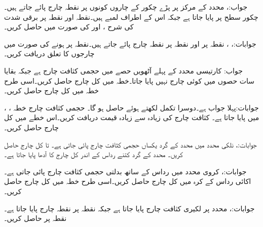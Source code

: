 جواب:، 
محدد کے مرکز پر پڑے چکور کے چاروں کونوں پر  نقطہ چارج پائے جاتے ہیں۔چکور  سطح پر پایا جاتا ہے جبکہ اس کے اطراف  لمبے ہیں۔نقطہ  اور نقطہ  پر برقی شدت کی شرح ،  اور  کی صورت میں حاصل کریں۔

جوابات:، ، 
نقطہ  پر  اور نقطہ  پر  نقطہ چارج پائے جاتے ہیں۔نقطہ  پر  ہونے کی صورت میں چارجوں کا تعلق دریافت کریں۔ 

جواب:
کارتیسی محدد کے پہلے آٹھویں حصے  میں حجمی کثافت چارج  ہے جبکہ بقایا سات حصوں میں کوئی چارج نہیں پایا جاتا۔خطہ  میں کل چارج حاصل کریں۔اسی طرح خطہ  میں کل چارج حاصل کریں۔

جوابات:پہلا جواب  ہے۔دوسرا تکمل  لکھتے ہوئے  حاصل ہو گا۔ 
حجمی کثافت چارج  خطہ ، ،  میں پایا جاتا ہے۔ کثافت چارج کی زیادہ سے زیادہ قیمت دریافت کریں۔اس خطے میں کل چارج حاصل کریں۔

جوابات:، 
نلکی محدد میں  محدد کے گرد یکساں حجمی کثافت چارج  پائی جاتی ہے۔ تا  کل چارج حاصل کریں۔ محدد کے گرد کتنے رداس کے اندر کل چارج کا آدھا پایا جاتا ہے۔

جوابات:،  
کروی محدد میں رداس کے ساتھ بدلتی حجمی کثافت چارج  پائی جاتی ہے۔اکائی رداس کے کرہ میں کل چارج حاصل کریں۔اسی طرح خطہ  میں کل چارج حاصل کریں۔ 

جوابات:، 
 محدد پر  لکیری کثافت چارج پایا جاتا ہے جبکہ نقطہ  پر  نقطہ چارج پایا جاتا ہے۔نقطہ  پر  حاصل کریں۔

